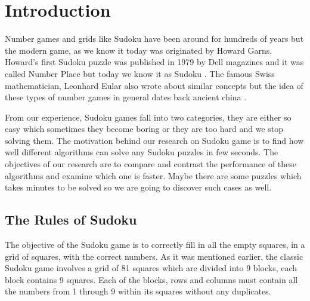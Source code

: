 \section{Introduction}
Number games and grids like Sudoku have been around for hundreds of years but the modern game, as we know it today was originated by Howard Garns. Howard’s first Sudoku puzzle was published in 1979 by Dell magazines and it was called Number Place but today we know it as Sudoku \cite{bib_madnumbers}. The famous Swiss mathematician, Leonhard Eular also wrote about similar concepts but the idea of these types of number games in general dates back ancient china \cite{bib_euler}.

From our experience, Sudoku games fall into two categories, they are either so easy which sometimes they become boring or they are too hard and we stop solving them. The motivation behind our research on Sudoku game is to find how well different algorithms can solve any Sudoku puzzles in few seconds. The objectives of our research are to compare and contrast the performance of these algorithms and examine which one is faster. Maybe there are some puzzles which takes minutes to be solved so we are going to discover such cases as well.

\subsection{The Rules of Sudoku}

The objective of the Sudoku game is to correctly fill in all the empty squares, in a grid of squares, with the correct numbers. As it was mentioned earlier, the classic Sudoku game involves a grid of 81 squares which are divided into 9 blocks, each block contains 9 squares. Each of the blocks, rows and columns must contain all the numbers from 1 through 9 within its squares without any duplicates.